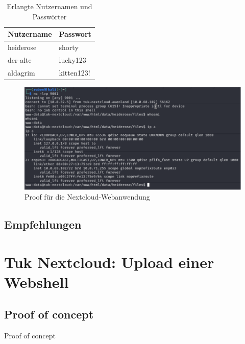 \begin{table}[!ht]
    \centering
    \begin{tabular}{|l|l|}
        \hline
        \textbf{Nutzername} & \textbf{Passwort} \\
        \hline
        heiderose & shorty \\
        der-alte & lucky123 \\
        aldagrim & kitten123! \\
        \hline
    \end{tabular}
    \caption{Erlangte Nutzernamen und Passwörter}
    \label{tab:nextcloud:user}
\end{table}

\begin{figure}[!ht]
    \centering
    \includegraphics[width=\linewidth]{images/proofs/04_nextcloud_proof.png}
    \caption{Proof für die Nextcloud-Webanwendung}
    \label{fig:04_nextcloud_proof}
\end{figure}

\subsection*{Empfehlungen}


\section{\makecvssbadge Tuk Nextcloud: Upload einer Webshell}

\subsection*{Proof of concept}
Proof of concept

